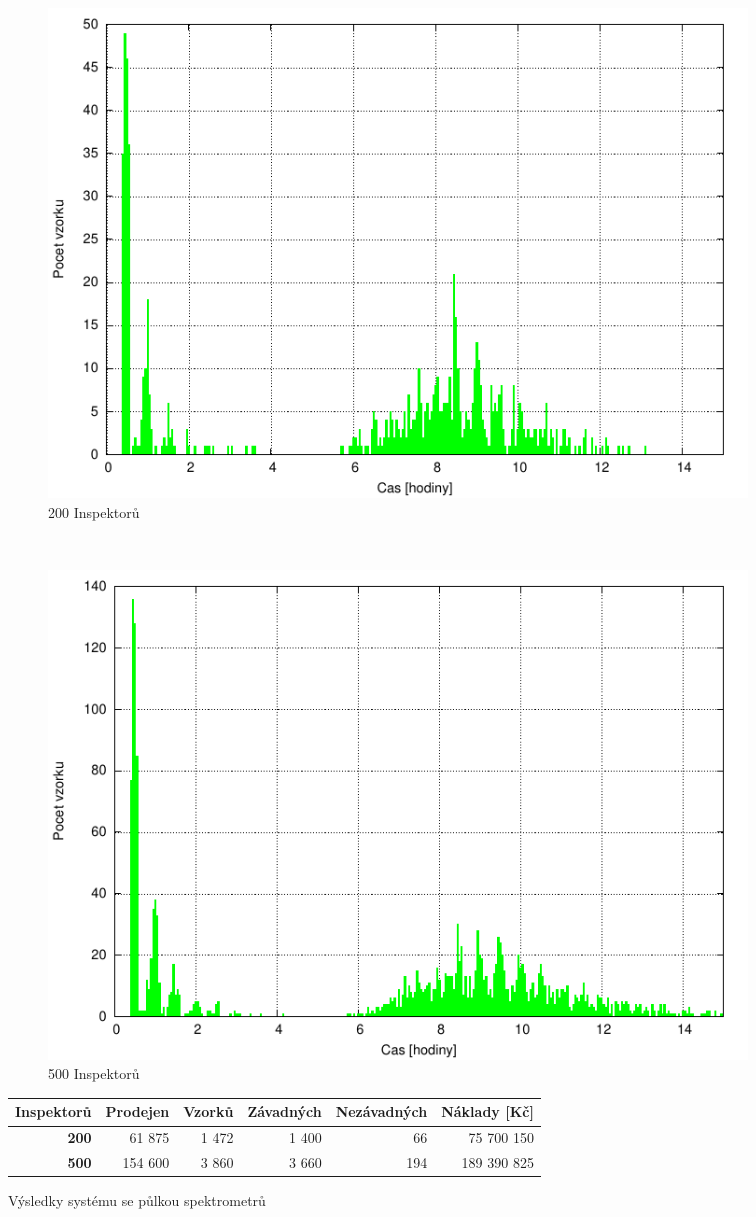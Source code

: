 \documentclass[11pt,a4paper]{article}
\begin{document}
\begin{figure}[h!]
  \centering
  \begin{subfigure}[t]{0.5\textwidth}
    \centering
    \includegraphics[width=\textwidth]{exp3_200}
    \caption{200 Inspektorů}
    \label{halfa}
  \end{subfigure}~\begin{subfigure}[t]{0.5\textwidth}
    \centering
    \includegraphics[width=\textwidth]{exp3_500}
    \caption{500 Inspektorů}
    \label{halfb}
  \end{subfigure}
  \begin{tabular}{|r|r|r|r|r|r|}  \hline
        \textbf{Inspektorů}&\textbf{Prodejen} & \textbf{Vzorků} & \textbf{Závadných}   
        & \textbf{Nezávadných} & \textbf{Náklady [Kč]} \\\hline
        \textbf{200}&61 875&1 472&1 400&66&75 700 150         \\\hline
        \textbf{500}&154 600&3 860&3 660&194&189 390 825         \\\hline
      \end{tabular}
      \caption{Výsledky systému se půlkou spektrometrů}
\end{figure} 
\end{document}
